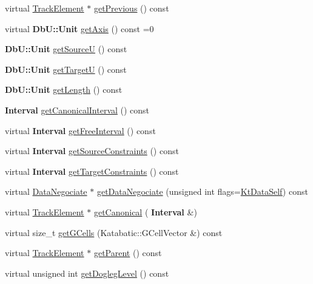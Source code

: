 \begin{DoxyCompactItemize}
virtual \hyperlink{classKite_1_1TrackElement}{Track\+Element} $\ast$ \hyperlink{classKite_1_1TrackElement_a55d6115d84c11ad147f4c38fe372ea24}{get\+Previous} () const
\item 
virtual \textbf{ Db\+U\+::\+Unit} \hyperlink{classKite_1_1TrackElement_ac492fb5399691d81c31547db6b56fd03}{get\+Axis} () const =0
\item 
\textbf{ Db\+U\+::\+Unit} \hyperlink{classKite_1_1TrackElement_ad521ffba761b0e81b7b81b99d62f76f9}{get\+SourceU} () const
\item 
\textbf{ Db\+U\+::\+Unit} \hyperlink{classKite_1_1TrackElement_a4d52a506cd19dfa8e22e1dc0695bd960}{get\+TargetU} () const
\item 
\textbf{ Db\+U\+::\+Unit} \hyperlink{classKite_1_1TrackElement_ab1ca7adfc68761c749a16f65c9aa4088}{get\+Length} () const
\item 
\textbf{ Interval} \hyperlink{classKite_1_1TrackElement_ae96c050b96eaea51a3821cc01a1f3334}{get\+Canonical\+Interval} () const
\item 
virtual \textbf{ Interval} \hyperlink{classKite_1_1TrackElement_a034711e2d3617ea848ef9f5a18255e10}{get\+Free\+Interval} () const
\item 
virtual \textbf{ Interval} \hyperlink{classKite_1_1TrackElement_a48f8b54f9489da3778d85c382a483f81}{get\+Source\+Constraints} () const
\item 
virtual \textbf{ Interval} \hyperlink{classKite_1_1TrackElement_a69af7d4287bc0e44c9ca2c8e6f692be9}{get\+Target\+Constraints} () const
\item 
virtual \hyperlink{classKite_1_1DataNegociate}{Data\+Negociate} $\ast$ \hyperlink{classKite_1_1TrackElement_acd0170a05128ec4af16ecd0060c3a3b5}{get\+Data\+Negociate} (unsigned int flags=\hyperlink{namespaceKite_acca8fffa3182dea5f94208f454f14b47a68e917ff37d4b5cef906303181836404}{Kt\+Data\+Self}) const
\item 
virtual \hyperlink{classKite_1_1TrackElement}{Track\+Element} $\ast$ \hyperlink{classKite_1_1TrackElement_af2d46d64cbd02bdbba53d5483d95e26d}{get\+Canonical} (\textbf{ Interval} \&)
\item 
virtual size\+\_\+t \hyperlink{classKite_1_1TrackElement_af45301f76558f613ccb605a8f851080e}{get\+G\+Cells} (Katabatic\+::\+G\+Cell\+Vector \&) const
\item 
virtual \hyperlink{classKite_1_1TrackElement}{Track\+Element} $\ast$ \hyperlink{classKite_1_1TrackElement_a95ec3b8e7e1ec87c20ee0b37bcc96df7}{get\+Parent} () const
\item 
virtual unsigned int \hyperlink{classKite_1_1TrackElement_add78c6f914788c549f144998caacda84}{get\+Dogleg\+Level} () const

\end{DoxyCompactItemize}
